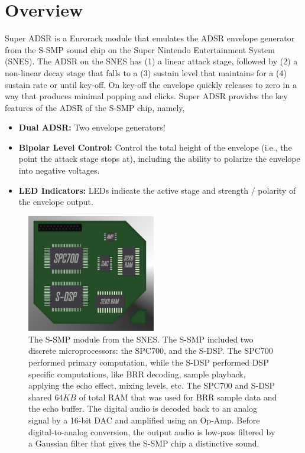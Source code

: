 \documentclass[12pt,letter]{article}
\begin{document}


\section{Overview}

Super ADSR is a Eurorack module that emulates the ADSR envelope generator from the S-SMP sound chip on the Super Nintendo Entertainment System (SNES). The ADSR on the SNES has (1) a linear attack stage, followed by (2) a non-linear decay stage that falls to a (3) sustain level that maintains for a (4) sustain rate or until key-off. On key-off the envelope quickly releases to zero in a way that produces minimal popping and clicks. Super ADSR provides the key features of the ADSR of the S-SMP chip, namely,
\begin{itemize}
  \item \textbf{Dual ADSR:} Two envelope generators!
  \item \textbf{Bipolar Level Control:} Control the total height of the envelope (i.e., the point the attack stage stops at), including the ability to polarize the envelope into negative voltages.
  \item \textbf{LED Indicators:} LEDs indicate the active stage and strength / polarity of the envelope output.
\end{itemize}

\begin{figure}[!b]
\centering
\includegraphics[width=0.5\textwidth]{img/Chip}
\caption*{\small The S-SMP module from the SNES. The S-SMP included two discrete microprocessors: the SPC700, and the S-DSP. The SPC700 performed primary computation, while the S-DSP performed DSP specific computations, like BRR decoding, sample playback, applying the echo effect, mixing levels, etc. The SPC700 and S-DSP shared $64KB$ of total RAM that was used for BRR sample data and the echo buffer. The digital audio is decoded back to an analog signal by a 16-bit DAC and amplified using an Op-Amp. Before digital-to-analog conversion, the output audio is low-pass filtered by a Gaussian filter that gives the S-SMP chip a distinctive sound.}
\end{figure}
\end{document}
